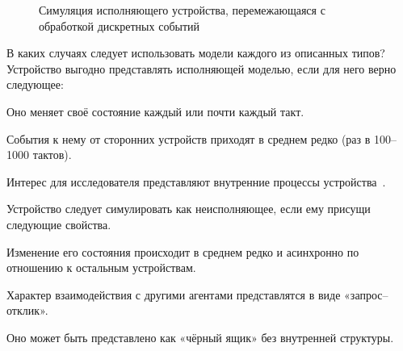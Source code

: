 \begin{figure}[htb]
    \centering
    \caption{Симуляция исполняющего устройства, перемежающаяся с обработкой дискретных событий}
    \label{fig:queue2}
\end{figure}

В каких случаях следует использовать модели каждого из описанных типов? Устройство выгодно представлять исполняющей моделью, если для него верно следующее:
\begin{enumerate*}
    \item Оно меняет своё состояние каждый или почти каждый такт.
    \item События к нему от сторонних устройств приходят в среднем редко (раз в 100--1000 тактов).
    \item Интерес для исследователя представляют внутренние процессы устройства~\cite{fritzson2004principles}.
\end{enumerate*}

Устройство следует симулировать как неисполняющее, если ему присущи следующие свойства.
\begin{enumerate*}
    \item Изменение его состояния происходит в среднем редко и асинхронно по отношению к остальным устройствам.
    \item Характер взаимодействия с другими агентами представлятся в виде «запрос--отклик».
    \item Оно может быть представлено как «чёрный ящик» без внутренней структуры.
\end{enumerate*}

